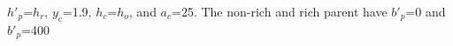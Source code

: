 $h'_p$=$h_r$, $y_c$=1.9, $h_c$=$h_o$, and $a_c$=25. The non-rich and rich parent have $b'_p$=0 and $b'_p$=400